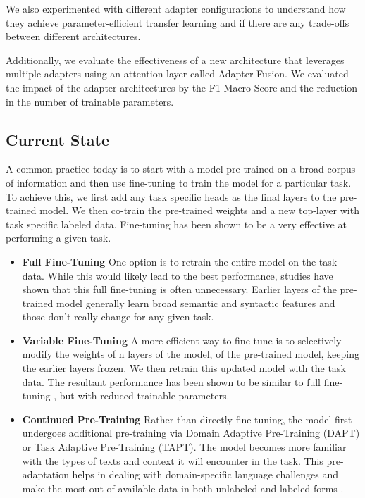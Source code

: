 \documentclass[10pt,twocolumn,letterpaper]{article}
\begin{document}
We also experimented with different adapter configurations to understand how they achieve parameter-efficient transfer learning and if there are any trade-offs between different architectures.

Additionally, we evaluate the effectiveness of a new architecture that leverages multiple adapters using an attention layer called Adapter Fusion. We evaluated the impact of the adapter architectures by the F1-Macro Score and the reduction in the number of trainable parameters.

\subsection{Current State} A common practice today is to start with a model pre-trained on a broad corpus of information and then use fine-tuning to train the model for a particular task. To achieve this, we first add any task specific heads as the final layers to the pre-trained model. We then co-train the pre-trained weights and a new top-layer with task specific labeled data. Fine-tuning has been shown to be a very effective at performing a given task.
\begin{itemize}
\item \textbf{Full Fine-Tuning} One option is to retrain the entire model on the task data. While this would likely lead to the best performance, studies have shown that this full fine-tuning is often unnecessary. Earlier layers of the pre-trained model generally learn broad semantic and syntactic features and those don’t really change for any given task. 
\item \textbf{Variable Fine-Tuning} A more efficient way to fine-tune is to selectively modify the weights of n layers of the model, of the pre-trained model, keeping the earlier layers frozen. We then retrain this updated model with the task data. The resultant performance has been shown to be similar to full fine-tuning \cite{houlsby2019parameter}, but with reduced trainable parameters.
\item \textbf{Continued Pre-Training} Rather than directly fine-tuning, the model first undergoes additional pre-training via Domain Adaptive Pre-Training (DAPT) or Task Adaptive Pre-Training (TAPT). The model becomes more familiar with the types of texts and context it will encounter in the task. This pre-adaptation helps in dealing with domain-specific language challenges and make the most out of available data in both unlabeled and labeled forms \cite{gururangan2020dont}.
\end{itemize}
\end{document}
